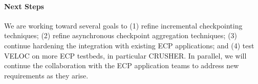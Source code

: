 \paragraph{Next Steps}
We are working toward several goals to (1) refine incremental
checkpointing techniques; (2) refine asynchronous checkpoint
aggregation techniques; (3) continue hardening the integration with
existing ECP applications; and (4) test VELOC on more ECP testbeds, in
particular CRUSHER. In parallel, we will continue the collaboration
with the ECP application teams to address new requirements as they
arise.
